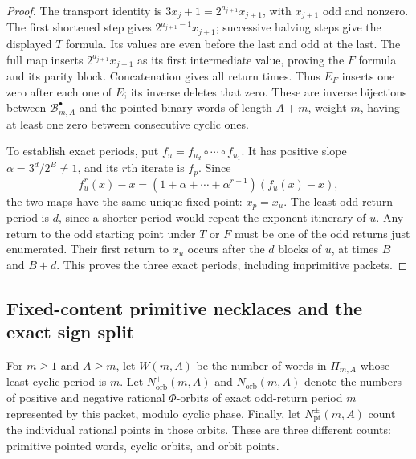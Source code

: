 \begin{proof}
The transport identity is $3x_j+1=2^{a_{j+1}}x_{j+1}$, with
$x_{j+1}$ odd and nonzero.  The first shortened step gives
$2^{a_{j+1}-1}x_{j+1}$; successive halving steps give the displayed
$T$ formula.  Its values are even before the last and odd at the last.
The full map inserts $2^{a_{j+1}}x_{j+1}$ as its first intermediate
value, proving the $F$ formula and its parity block.  Concatenation gives
all return times.  Thus $E_F$ inserts one zero after each one of $E$;
its inverse deletes that zero.  These are inverse bijections between
$\mathcal B_{m,A}^{\bullet}$ and the pointed binary words of length
$A+m$, weight $m$, having at least one zero between consecutive cyclic ones.

To establish exact periods, put $f_u=f_{u_d}\circ\cdots\circ f_{u_1}$.
It has positive slope $\alpha=3^d/2^B\ne1$, and its $r$th iterate is
$f_p$.  Since
\[
 f_u^r(x)-x=(1+\alpha+\cdots+\alpha^{r-1})(f_u(x)-x),
\]
the two maps have the same unique fixed point: $x_p=x_u$.
The least odd-return period is $d$, since a shorter period would repeat
the exponent itinerary of $u$.  Any return to the odd starting point under
$T$ or $F$ must be one of the odd returns just enumerated.  Their first
return to $x_u$ occurs after the $d$ blocks of $u$, at times $B$ and $B+d$.
This proves the three exact periods, including imprimitive packets.
\end{proof}

\subsection{Fixed-content primitive necklaces and the exact sign split}

For $m\geq1$ and $A\geq m$, let $W(m,A)$ be the number of words in
$\Pi_{m,A}$ whose least cyclic period is $m$.  Let
$N_{\mathrm{orb}}^{+}(m,A)$ and $N_{\mathrm{orb}}^{-}(m,A)$ denote the
numbers of positive and negative rational $\Phi$-orbits of exact odd-return
period $m$ represented by this packet, modulo cyclic phase.  Finally, let
$N_{\mathrm{pt}}^{\pm}(m,A)$ count the individual rational points in those
orbits.  These are three different counts: primitive pointed words, cyclic
orbits, and orbit points.

